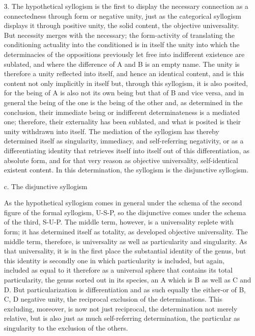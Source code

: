 3. The hypothetical syllogism is the first to display
the necessary connection as a connectedness through form or negative unity,
just as the categorical syllogism displays it through positive unity,
the solid content, the objective universality.
But necessity merges with the necessary;
the form-activity of translating the conditioning actuality
into the conditioned is in itself the unity
into which the determinacies of the oppositions
previously let free into indifferent existence are sublated,
and where the difference of A and B is an empty name.
The unity is therefore a unity reflected into itself,
and hence an identical content,
and is this content not only implicitly in itself
but, through this syllogism, it is also posited,
for the being of A is also not its own being
but that of B and vice versa,
and in general the being of the one
is the being of the other
and, as determined in the conclusion,
their immediate being or indifferent determinateness
is a mediated one;
therefore, their externality has been sublated,
and what is posited is their unity withdrawn into itself.
The mediation of the syllogism has thereby determined itself
as singularity, immediacy, and self-referring negativity,
or as a differentiating identity that retrieves itself
into itself out of this differentiation, as absolute form,
and for that very reason as objective universality,
self-identical existent content.
In this determination, the syllogism is the disjunctive syllogism.

c. The disjunctive syllogism

As the hypothetical syllogism comes in general
under the schema of the second figure of the formal syllogism, U-S-P,
so the disjunctive comes under the schema of the third, S-U-P.
The middle term, however, is a universality replete with form;
it has determined itself as totality,
as developed objective universality.
The middle term, therefore, is universality as well as
particularity and singularity.
As that universality, it is in the first place
the substantial identity of the genus,
but this identity is secondly one in which
particularity is included,
but again, included as equal to it
therefore as a universal sphere
that contains its total particularity,
the genus sorted out in its species,
an A which is B as well as C and D.
But particularization is differentiation
and as such equally the either-or of B, C, D
negative unity, the reciprocal exclusion of the determinations.
This excluding, moreover, is now not just reciprocal,
the determination not merely relative,
but is also just as much self-referring determination,
the particular as singularity to the exclusion of the others.

